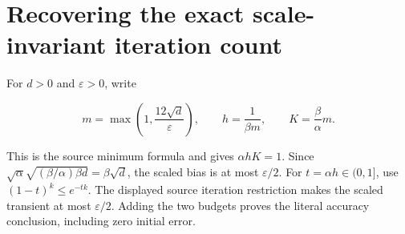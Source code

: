 \documentclass[11pt,a4paper]{article}
\begin{document}
\section{\texorpdfstring{Recovering the exact scale-invariant iteration count}{Recovering the exact scale-invariant iteration count}}


For \(d>0\) and \(\varepsilon>0\), write


    \[m=\max\left(1,\frac{12\sqrt d}{\varepsilon}\right),\qquad
    h=\frac1{\beta m},\qquad K=\frac\beta\alpha m.\]


This is the source minimum formula and gives \(\alpha hK=1\).
    Since
    \(\sqrt\alpha\sqrt{(\beta/\alpha)\beta d}=\beta\sqrt d\),
    the scaled bias is at most \(\varepsilon/2\).
    For \(t=\alpha h\in(0,1]\), use \((1-t)^k\le e^{-tk}\).
    The displayed source iteration restriction makes the scaled transient
    at most \(\varepsilon/2\). Adding the two budgets proves the
    literal accuracy conclusion, including zero initial error.
\end{document}
